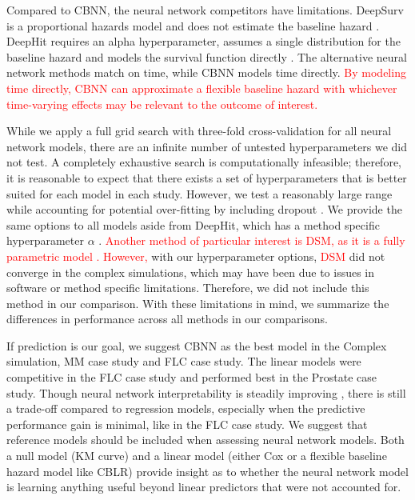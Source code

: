 \documentclass[preprint,12pt,authoryear]{elsarticle}
\begin{document}
Compared to CBNN, the neural network competitors have limitations. DeepSurv is a proportional hazards model and does not estimate the baseline hazard \citep{katzman2018DeepSurv}. DeepHit requires an alpha hyperparameter, assumes a single distribution for the baseline hazard and models the survival function directly \citep{lee2018DeepHit}. The alternative neural network methods match on time, while CBNN models time directly. \textcolor{red}{By modeling time directly, CBNN can approximate a flexible baseline hazard with whichever time-varying effects may be relevant to the outcome of interest.}

While we apply a full grid search with three-fold cross-validation for all neural network models, there are an infinite number of untested hyperparameters we did not test. A completely exhaustive search is computationally infeasible; therefore, it is reasonable to expect that there exists a set of hyperparameters that is better suited for each model in each study. However, we test a reasonably large range while accounting for potential over-fitting by including dropout \citep{srivastava2014dropout}. We provide the same options to all models aside from DeepHit, which has a method specific hyperparameter $\alpha$ \citep{lee2018DeepHit}. \textcolor{red}{Another method of particular interest is DSM, as it is a fully parametric model \citep{dsmPaper}. However,} with our hyperparameter options, \textcolor{red}{DSM} did not converge in the complex simulations, which may have been due to issues in software or method specific limitations. Therefore, we did not include this method in our comparison. With these limitations in mind, we summarize the differences in performance across all methods in our comparisons. 

If prediction is our goal, we suggest CBNN as the best model in the Complex simulation, MM case study and FLC case study. The linear models were competitive in the FLC case study and performed best in the Prostate case study. Though neural network interpretability is steadily improving \citep{interpret}, there is still a trade-off compared to regression models, especially when the predictive performance gain is minimal, like in the FLC case study. We suggest that reference models should be included when assessing neural network models. Both a null model (KM curve) and a linear model (either Cox or a flexible baseline hazard model like CBLR) provide insight as to whether the neural network model is learning anything useful beyond linear predictors that were not accounted for.
\end{document}

